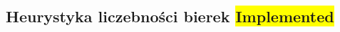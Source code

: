 \subsection{Heurystyka liczebności bierek \colorbox{yellow}{Implemented}}
\label{subsec:heurystyka-liczebnosci-bierek}
